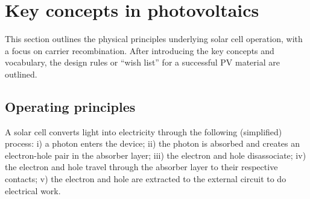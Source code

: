
\section{Key concepts in photovoltaics}

This section outlines the physical principles underlying solar cell operation, with a focus on carrier recombination. After introducing the key concepts and vocabulary, the design rules or ``wish list'' for a successful PV material are outlined. 

\subsection{Operating principles} \label{operatingprinciples}


A solar cell converts light into electricity through the following (simplified) process: i) a photon enters the device; ii) the photon is absorbed and creates an electron-hole pair in the absorber layer; iii) the electron and hole disassociate; iv) the electron and hole travel through the absorber layer to their respective contacts; v) the electron and hole are extracted to the external circuit to do electrical work.

